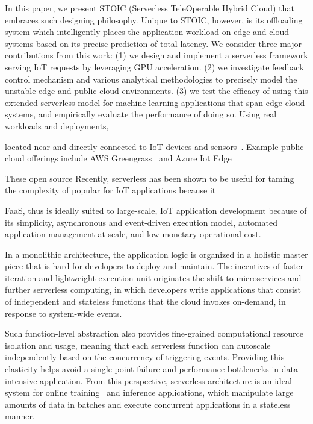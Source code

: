 \iffalse
In this paper, we present STOIC (Serverless TeleOperable Hybrid Cloud) that embraces such designing philosophy. Unique to STOIC, however, is its offloading system which intelligently places the application workload on edge and cloud systems based on its precise prediction of total latency. We consider three major contributions from this work: (1) we design and implement a serverless framework serving IoT requests by leveraging GPU acceleration. (2) we investigate feedback control mechanism and various analytical methodologies to precisely model the unstable edge and public cloud environments. (3) we test the efficacy of using this extended serverless model for machine learning applications that span edge-cloud systems, and empirically evaluate the performance of doing so. Using real workloads and deployments, 

located near and directly
connected to IoT devices and
sensors~\cite{edge,bonomi2012fog,cloudlets,cloudlets2012satya,verbelen2012cloudlets}.
Example public cloud offerings include AWS Greengrass~\cite{greengrassweb,awsiot-web} and
Azure Iot Edge~\cite{iotedge-web,iothub-web}


These open source 
Recently, serverless has been shown to be useful for taming the
complexity of  popular for IoT applications because it 

FaaS, thus is ideally suited to large-scale, IoT application development because of its simplicity,
asynchronous and event-driven execution model, automated application management at scale,
and low monetary operational cost.

In a monolithic architecture, the application logic is organized in a holistic master piece that is hard for developers to deploy and maintain. The incentives of faster iteration and lightweight execution unit originates the shift to microservices and further serverless computing, in which developers write applications that consist of independent and stateless functions that the cloud invokes on-demand, in response to system-wide events.

Such function-level abstraction also provides fine-grained computational resource isolation and usage, meaning that each serverless function can autoscale independently based on the concurrency of triggering events. Providing this elasticity helps avoid a single point failure and performance bottlenecks in data-intensive application. From this perspective, serverless architecture is an ideal system for online training~\cite{ref:online} and inference applications, which manipulate large amounts of data in batches and execute concurrent applications in a stateless manner.

